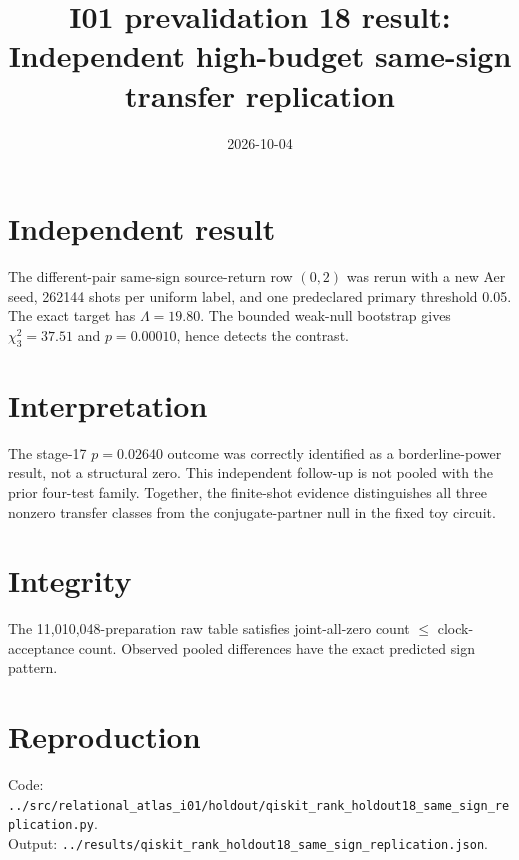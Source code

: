 \documentclass[11pt]{article}
\begin{document}
\title{I01 prevalidation 18 result:\\Independent high-budget same-sign transfer replication}
\date{2026-10-04}
\maketitle

\section*{Independent result}
The different-pair same-sign source-return row $(0,2)$ was rerun with a new Aer
seed, 262144 shots per uniform label, and one predeclared primary threshold 0.05.
The exact target has $\Lambda=19.80$. The bounded weak-null bootstrap gives
$\chi^2_3=37.51$ and $p=0.00010$, hence detects the contrast.

\section*{Interpretation}
The stage-17 $p=0.02640$ outcome was correctly identified as a borderline-power
result, not a structural zero. This independent follow-up is not pooled with the
prior four-test family. Together, the finite-shot evidence distinguishes all three
nonzero transfer classes from the conjugate-partner null in the fixed toy circuit.

\section*{Integrity}
The 11,010,048-preparation raw table satisfies joint-all-zero count
$\leq$ clock-acceptance count. Observed pooled differences have the exact predicted
sign pattern.

\section*{Reproduction}
Code: \texttt{../src/relational\_atlas\_i01/holdout/qiskit\_rank\_holdout18\_same\_sign\_replication.py}.\\
Output: \texttt{../results/qiskit\_rank\_holdout18\_same\_sign\_replication.json}.
\end{document}

